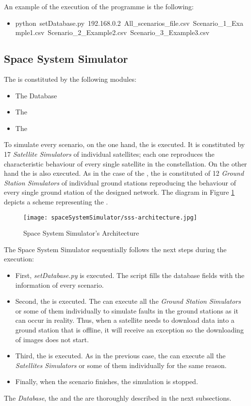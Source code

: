 An example of the execution of the programme is the following:
\begin{itemize}
\item python~setDatabase.py~192.168.0.2~All\_scenarios\_file.csv~Scenario\_1\_Example1.csv~Scenario\_2\_Example2.csv~Scenario\_3\_Example3.csv
\end{itemize}


\subsection{Space System Simulator}

The \sss is constituted by the following modules:
\begin{itemize}
\item The Database
\item The \satss
\item The \gsss
\end{itemize}


To simulate every scenario, on the one hand, the \satss is executed. It is
constituted by 17 \emph{Satellite Simulators} of individual satellites; each one
reproduces the characteristic behaviour of every single satellite in the
constellation.
On the other hand the \gsss is also executed. As in the case of the \satss, the
\gsss is constituted of 12 \emph{Ground Station Simulators} of individual ground
stations reproducing the behaviour of every single ground station of the
designed network. 
The diagram in Figure \ref{fig:sss-architecture} depicts a scheme
representing the \sss.

\begin{figure}[!h]
\begin{center}
\texttt{[image: spaceSystemSimulator/sss-architecture.jpg]}
\caption{Space System Simulator's Architecture}
\label{fig:sss-architecture}
\end{center}
\end{figure}

The Space System Simulator sequentially follows the next steps during the
execution:
\begin{itemize}

\item First, \emph{setDatabase.py} is executed. The script fills the database fields with the information of every scenario.
\item Second, the \gsss is executed. The \gsss can execute all the \emph{Ground Station Simulators} or some of them individually to simulate faults in the ground stations as it can occur in reality. Thus, when a satellite needs to download data into a ground station that is offline, it will receive an exception so the downloading of images does not start.
\item Third, the \satss is executed. As in the previous case, the \satss can execute all the \emph{Satellites Simulators} or some of them individually for the same reason. 
\item Finally, when the scenario finishes, the simulation is stopped.
\end{itemize}
The \emph{Database}, the \satss and the \gsss are thoroughly described in the
next subsections. 

